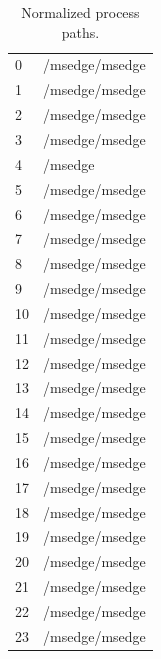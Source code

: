 \documentclass[a4paper,twoside,12pt]{book}
\begin{document}
\begin{appendices}
\begin{table}
	\centering
	\caption{Normalized process paths.}
	\label{id:tab:fullPaths}
	\begin{tabular}{ll}
		\toprule
		0   &                                     /msedge/msedge \\
		1   &                                     /msedge/msedge \\
		2   &                                     /msedge/msedge \\
		3   &                                     /msedge/msedge \\
		4   &                                            /msedge \\
		5   &                                     /msedge/msedge \\
		6   &                                     /msedge/msedge \\
		7   &                                     /msedge/msedge \\
		8   &                                     /msedge/msedge \\
		9   &                                     /msedge/msedge \\
		10  &                                     /msedge/msedge \\
		11  &                                     /msedge/msedge \\
		12  &                                     /msedge/msedge \\
		13  &                                     /msedge/msedge \\
		14  &                                     /msedge/msedge \\
		15  &                                     /msedge/msedge \\
		16  &                                     /msedge/msedge \\
		17  &                                     /msedge/msedge \\
		18  &                                     /msedge/msedge \\
		19  &                                     /msedge/msedge \\
		20  &                                     /msedge/msedge \\
		21  &                                     /msedge/msedge \\
		22  &                                     /msedge/msedge \\
		23  &                                     /msedge/msedge \\

\end{tabular}
\end{table}
\end{appendices}
\end{document}
